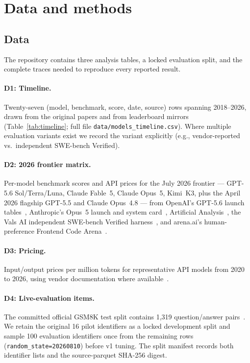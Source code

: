\section{Data and methods}\label{sec:methods}

\subsection{Data}
The repository contains three analysis tables, a locked evaluation split, and
the complete traces needed to reproduce every reported result.

\paragraph{D1: Timeline.} Twenty-seven (model, benchmark, score, date, source)
rows spanning 2018--2026, drawn from the original papers and from leaderboard
mirrors (Table~\ref{tab:timeline}; full file \texttt{data/models\_timeline.csv}).
Where multiple evaluation variants exist we record the variant explicitly
(e.g., vendor-reported vs.\ independent SWE-bench Verified).

\paragraph{D2: 2026 frontier matrix.} Per-model benchmark scores and API prices
for the July 2026 frontier --- GPT-5.6 Sol/Terra/Luna, Claude Fable~5, Claude
Opus~5, Kimi~K3, plus the April 2026 flagship GPT-5.5 and Claude Opus~4.8 ---
from OpenAI's GPT-5.6 launch tables~\cite{openai2026gpt56}, Anthropic's Opus~5
launch and system card~\cite{anthropic2026opus5,anthropic2026opus5card},
Artificial Analysis~\cite{aa2026gpt56,gist2026aa56}, the Vals AI independent
SWE-bench Verified harness~\cite{vals2026swebench}, and arena.ai's
human-preference Frontend Code Arena~\cite{arena2026webdev}.

\paragraph{D3: Pricing.} Input/output prices per million tokens for
representative API models from 2020 to 2026, using vendor documentation where
available~\cite{deploybase2026prices,openai2026gpt56}.

\paragraph{D4: Live-evaluation items.} The committed official GSM8K test split
contains 1,319 question/answer pairs~\cite{cobbe2021gsm8k}. We retain the
original 16 pilot identifiers as a locked development split and sample 100
evaluation identifiers once from the remaining rows
(\texttt{random\_state=20260810}) before v1 tuning. The split manifest records
both identifier lists and the source-parquet SHA-256 digest.

